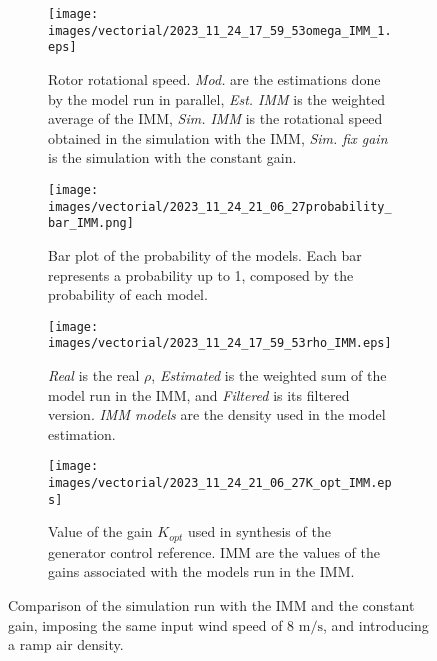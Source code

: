 \begin{figure}[htb]
  \begin{subfigure}{0.49\columnwidth}
    \centering
    \texttt{[image: images/vectorial/2023\_11\_24\_17\_59\_53omega\_IMM\_1.eps]}
    \caption{Rotor rotational speed. \textit{Mod.} are the estimations done by the model run in parallel, \textit{Est. IMM} is the weighted average of the IMM, \textit{Sim. IMM} is the rotational speed obtained in the simulation with the IMM, \textit{Sim. fix gain} is the simulation with the constant gain.}
    \label{fig:fig_omega_IMM_1}
  \end{subfigure}
  \begin{subfigure}{0.49\columnwidth}
    \centering
    \texttt{[image: images/vectorial/2023\_11\_24\_21\_06\_27probability\_bar\_IMM.png]}
    \caption{Bar plot of the probability of the models. Each bar represents a probability up to 1, composed by the probability of each model.}
    \label{fig:fig_probability_IMM}
  \end{subfigure}
  \begin{subfigure}{0.49\columnwidth}
    \centering
    \texttt{[image: images/vectorial/2023\_11\_24\_17\_59\_53rho\_IMM.eps]}
    \caption{\textit{Real} is the real $\rho$, \textit{Estimated} is the weighted sum of the model run in the IMM, and \textit{Filtered} is its filtered version. \textit{IMM models} are the density used in the model estimation.}
    \label{fig:fig_rho_IMM}
  \end{subfigure}
  \begin{subfigure}{0.49\columnwidth}
    \centering
    \texttt{[image: images/vectorial/2023\_11\_24\_21\_06\_27K\_opt\_IMM.eps]}
    \caption{Value of the gain $K_{opt}$ used in synthesis of the generator control reference. IMM are the values of the gains associated with the models run in the IMM.}
    \label{fig:fig_K_IMM}
  \end{subfigure}
  \caption{Comparison of the simulation run with the IMM and the constant gain, imposing the same input wind speed of 8 $\si{\meter\per\second}$, and introducing a ramp air density.}
  \label{fig:fig_IMM_sim_const_WS}
\end{figure}

